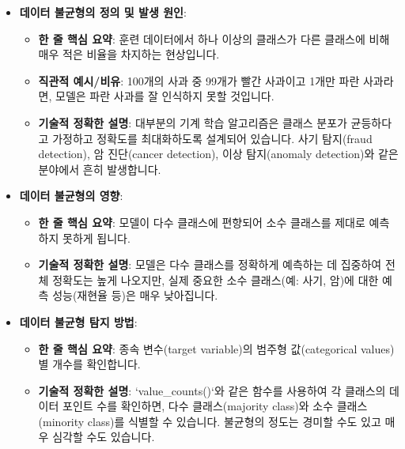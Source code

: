 \documentclass[11pt,a4paper]{article}
\begin{document}
\begin{itemize}
\begin{itemize}
\begin{itemize}
    \item \textbf{데이터 불균형의 정의 및 발생 원인}:
    \begin{itemize}
        \item \textbf{한 줄 핵심 요약}: 훈련 데이터에서 하나 이상의 클래스가 다른 클래스에 비해 매우 적은 비율을 차지하는 현상입니다.
        \item \textbf{직관적 예시/비유}: 100개의 사과 중 99개가 빨간 사과이고 1개만 파란 사과라면, 모델은 파란 사과를 잘 인식하지 못할 것입니다.
        \item \textbf{기술적 정확한 설명}: 대부분의 기계 학습 알고리즘은 클래스 분포가 균등하다고 가정하고 정확도를 최대화하도록 설계되어 있습니다. 사기 탐지(fraud detection), 암 진단(cancer detection), 이상 탐지(anomaly detection)와 같은 분야에서 흔히 발생합니다.
    \end{itemize}

    \item \textbf{데이터 불균형의 영향}:
    \begin{itemize}
        \item \textbf{한 줄 핵심 요약}: 모델이 다수 클래스에 편향되어 소수 클래스를 제대로 예측하지 못하게 됩니다.
        \item \textbf{기술적 정확한 설명}: 모델은 다수 클래스를 정확하게 예측하는 데 집중하여 전체 정확도는 높게 나오지만, 실제 중요한 소수 클래스(예: 사기, 암)에 대한 예측 성능(재현율 등)은 매우 낮아집니다.
    \end{itemize}

    \item \textbf{데이터 불균형 탐지 방법}:
    \begin{itemize}
        \item \textbf{한 줄 핵심 요약}: 종속 변수(target variable)의 범주형 값(categorical values)별 개수를 확인합니다.
        \item \textbf{기술적 정확한 설명}: `value_counts()`와 같은 함수를 사용하여 각 클래스의 데이터 포인트 수를 확인하면, 다수 클래스(majority class)와 소수 클래스(minority class)를 식별할 수 있습니다. 불균형의 정도는 경미할 수도 있고 매우 심각할 수도 있습니다.
    \end{itemize}


\end{itemize}
\end{itemize}
\end{itemize}
\end{document}
